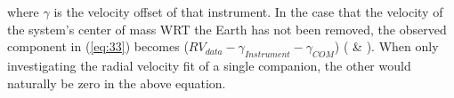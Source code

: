 \documentclass[12pt,preprint]{aastex}
\begin{document}
where $\gamma $ is the velocity offset of that instrument.  In the case that the velocity of the system's center of mass WRT the Earth has not been removed, the observed component in (\ref{eq:33}) becomes ($RV_{data}-\gamma_{Instrument}-\gamma_{COM}$) (\citet{Paddock} \& \citet{Shulze-Hartung}).  When only investigating the radial velocity fit of a single companion, the other would naturally be zero in the above equation.

\pagebreak

\clearpage
\end{document}
